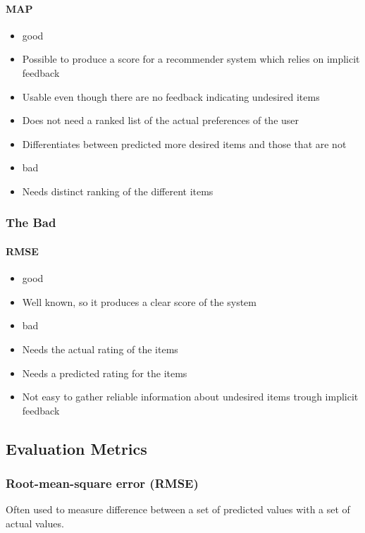 \paragraph{MAP}
\begin{itemize}
	\item good
	\item Possible to produce a score for a recommender system which relies on implicit feedback
	\item Usable even though there are no feedback indicating undesired items
	\item Does not need a ranked list of the actual preferences of the user
	\item Differentiates between predicted more desired items and those that are not
	\item bad
	\item Needs distinct ranking of the different items
\end{itemize}


\subsubsection{The Bad}
\paragraph{RMSE}
\begin{itemize}
	\item good
	\item Well known, so it produces a clear score of the system
	\item bad
	\item Needs the actual rating of the items
	\item Needs a predicted rating for the items
	\item Not easy to gather reliable information about undesired items trough implicit feedback
\end{itemize}






\subsection{Evaluation Metrics}

\subsubsection{Root-mean-square error (RMSE)}
Often used to measure difference between a set of predicted values with a set of actual values.


